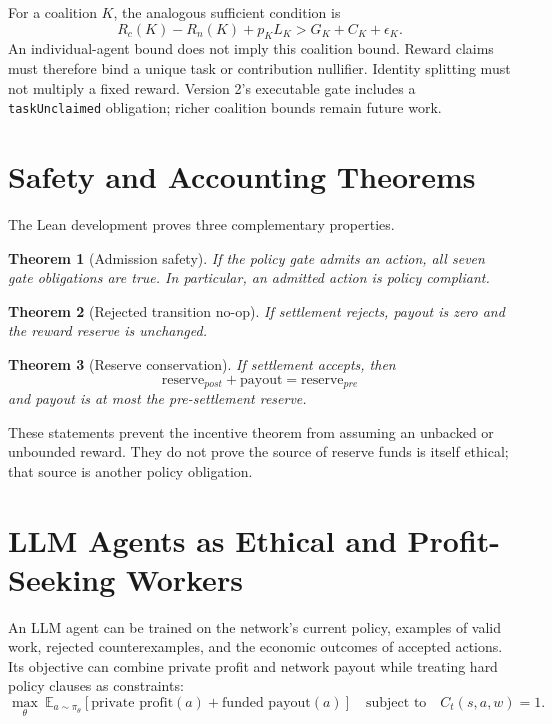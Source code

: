 \documentclass[11pt]{article}
\newtheorem{theorem}{Theorem}
\begin{document}
For a coalition $K$, the analogous sufficient condition is
\[
  R_c(K)-R_n(K)+p_KL_K > G_K+C_K+\epsilon_K.
\]
An individual-agent bound does not imply this coalition bound.  Reward claims
must therefore bind a unique task or contribution nullifier.  Identity splitting
must not multiply a fixed reward.  Version 2's executable gate includes a
\texttt{taskUnclaimed} obligation; richer coalition bounds remain future work.

\section{Safety and Accounting Theorems}

The Lean development proves three complementary properties.

\begin{theorem}[Admission safety]
If the policy gate admits an action, all seven gate obligations are true.  In
particular, an admitted action is policy compliant.
\end{theorem}

\begin{theorem}[Rejected transition no-op]
If settlement rejects, payout is zero and the reward reserve is unchanged.
\end{theorem}

\begin{theorem}[Reserve conservation]
If settlement accepts, then
\[
  \text{reserve}_{post}+\text{payout}=\text{reserve}_{pre}
\]
and payout is at most the pre-settlement reserve.
\end{theorem}

These statements prevent the incentive theorem from assuming an unbacked or
unbounded reward.  They do not prove the source of reserve funds is itself
ethical; that source is another policy obligation.

\section{LLM Agents as Ethical and Profit-Seeking Workers}

An LLM agent can be trained on the network's current policy, examples of valid
work, rejected counterexamples, and the economic outcomes of accepted actions.
Its objective can combine private profit and network payout while treating hard
policy clauses as constraints:
\[
  \max_\theta\ \mathbb{E}_{a\sim\pi_\theta}
    [\text{private profit}(a)+\text{funded payout}(a)]
  \quad\text{subject to}\quad C_t(s,a,w)=1.
\]
\end{document}
